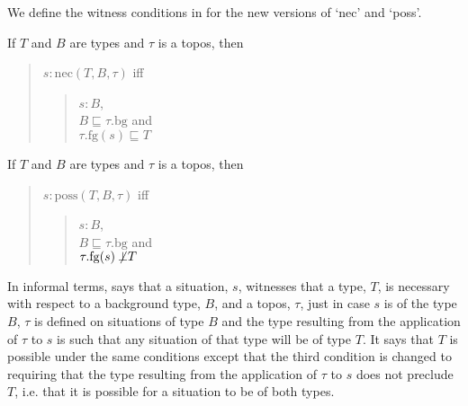 We define the witness conditions in \nexteg{} for the new versions of
`nec' and `poss'.
\begin{ex} 
\begin{subex} 
 
\item If $T$ and $B$ are types and $\tau$ is a topos, then
\begin{quote}
$s:\mathrm{nec}(T,B,\tau)$ iff
\begin{quote}
$s:B$, \\
$B\sqsubseteq\tau.\mathrm{bg}$ and \\
$\tau.\mathrm{fg}(s)\sqsubseteq T$
\end{quote}
\end{quote}
 
\item  If $T$ and $B$ are types and $\tau$ is a topos, then
\begin{quote}
$s:\mathrm{poss}(T,B,\tau)$ iff
\begin{quote}
$s:B$, \\
$B\sqsubseteq\tau.\mathrm{bg}$ and \\
$\tau.\mathrm{fg}(s)\not\!\!\bot T$
\end{quote}
\end{quote}
 
 
\end{subex} 
\label{ex:witness-conds-nec-poss-topos}   
\end{ex} 
In informal terms, \preveg{} says that a situation, $s$, witnesses that a
type, $T$, is necessary with respect to a background type, $B$, and a
topos, $\tau$, just in case $s$ is of the type $B$, $\tau$ is defined
on situations of type $B$ and the type resulting from the application
of $\tau$ to $s$ is such that any situation of that type will be of
type $T$.  It says that $T$ is possible under the same conditions
except that the third condition is changed to requiring that the type
resulting from the application of $\tau$ to $s$ does not preclude $T$,
i.e. that it is possible for a situation to be of both types.

